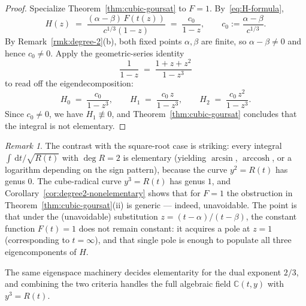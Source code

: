 \documentclass[11pt,a4paper]{article}
\theoremstyle{plain}
\theoremstyle{definition}
\theoremstyle{remark}
\newtheorem{remark}[theorem]{Remark}
\newcommand{\C}{\mathbb{C}}
\renewcommand{\d}{\,\mathrm{d}}
\begin{document}
\begin{proof}
Specialize Theorem~\ref{thm:cubic-goursat} to $F = 1$. By~\eqref{eq:H-formula},
\[
  H(z) \;=\; \frac{(\alpha-\beta)\,F(t(z))}{c^{1/3}(1-z)} \;=\; \frac{c_0}{1-z},\qquad c_0 := \frac{\alpha-\beta}{c^{1/3}}.
\]
By Remark~\ref{rmk:degree-2}(b), both fixed points $\alpha,\beta$ are finite, so $\alpha-\beta\neq 0$ and hence $c_0\neq 0$. Apply the geometric-series identity
\[
  \frac{1}{1-z} \;=\; \frac{1+z+z^2}{1-z^3}
\]
to read off the eigendecomposition:
\[
  H_0 \;=\; \frac{c_0}{1-z^3}, \qquad H_1 \;=\; \frac{c_0\,z}{1-z^3}, \qquad H_2 \;=\; \frac{c_0\,z^2}{1-z^3}.
\]
Since $c_0\neq 0$, we have $H_1\not\equiv 0$, and Theorem~\ref{thm:cubic-goursat} concludes that the integral is not elementary.
\end{proof}

\begin{remark}
The contrast with the square-root case is striking: every integral $\int\d t/\sqrt{R(t)}$ with $\deg R = 2$ is elementary (yielding $\arcsin$, $\operatorname{arccosh}$, or a logarithm depending on the sign pattern), because the curve $y^2 = R(t)$ has genus $0$. The cube-radical curve $y^3 = R(t)$ has genus $1$, and Corollary~\ref{cor:degree2-nonelementary} shows that for $F=1$ the obstruction in Theorem~\ref{thm:cubic-goursat}(ii) is generic — indeed, unavoidable. The point is that under the (unavoidable) substitution $z = (t-\alpha)/(t-\beta)$, the constant function $F(t) = 1$ does not remain constant: it acquires a pole at $z = 1$ (corresponding to $t = \infty$), and that single pole is enough to populate all three eigencomponents of $H$.
\end{remark}

The same eigenspace machinery decides elementarity for the dual exponent $2/3$, and combining the two criteria handles the full algebraic field $\C(t,y)$ with $y^3=R(t)$.
\end{document}

